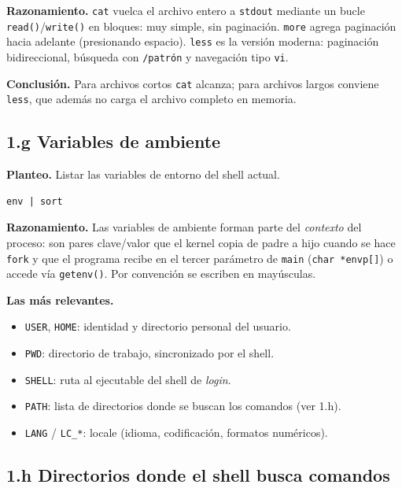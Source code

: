 \documentclass[11pt,a4paper]{article}
\begin{document}
\textbf{Razonamiento.} \texttt{cat} vuelca el archivo entero a
\texttt{stdout} mediante un bucle \texttt{read()}/\texttt{write()} en
bloques: muy simple, sin paginación. \texttt{more} agrega paginación
hacia adelante (presionando espacio). \texttt{less} es la versión
moderna: paginación bidireccional, búsqueda con \texttt{/patrón} y
navegación tipo \texttt{vi}.

\textbf{Conclusión.} Para archivos cortos \texttt{cat} alcanza; para
archivos largos conviene \texttt{less}, que además no carga el archivo
completo en memoria.

\subsection*{1.g Variables de ambiente}

\textbf{Planteo.} Listar las variables de entorno del shell actual.

\begin{lstlisting}
env | sort
\end{lstlisting}

\textbf{Razonamiento.} Las variables de ambiente forman parte del
\emph{contexto} del proceso: son pares clave/valor que el kernel copia
de padre a hijo cuando se hace \texttt{fork} y que el programa recibe
en el tercer parámetro de \texttt{main} (\texttt{char *envp[]}) o
accede vía \texttt{getenv()}. Por convención se escriben en mayúsculas.

\textbf{Las más relevantes.}
\begin{itemize}[leftmargin=*, itemsep=0pt]
    \item \texttt{USER}, \texttt{HOME}: identidad y directorio
        personal del usuario.
    \item \texttt{PWD}: directorio de trabajo, sincronizado por el
        shell.
    \item \texttt{SHELL}: ruta al ejecutable del shell de \emph{login}.
    \item \texttt{PATH}: lista de directorios donde se buscan los
        comandos (ver 1.h).
    \item \texttt{LANG} / \texttt{LC\_*}: locale (idioma, codificación,
        formatos numéricos).
\end{itemize}

\subsection*{1.h Directorios donde el shell busca comandos}
\end{document}
